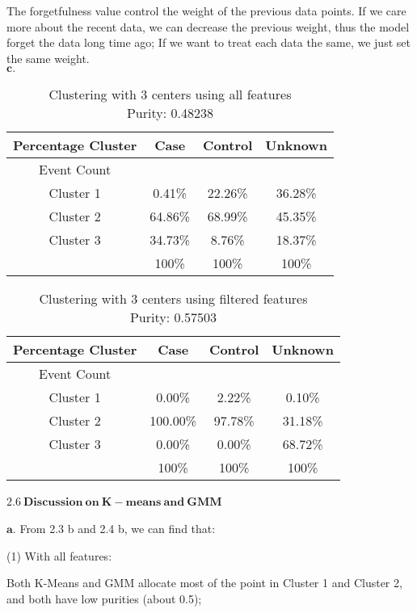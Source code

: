 \documentclass[12pt]{article}
\begin{document}
The forgetfulness value control the weight of the previous data points. If we care more about the recent data, we can decrease the previous weight, thus the model forget the data long time ago; If we want to treat each data the same, we just set the same weight.\\


$\mathbf{c.}$

\begin{table}[th]
\centering
\begin{tabular}{@{}c|c|c|c}
\hline
Percentage Cluster & Case & Control & Unknown  \\ \hline
Event Count & & &  \\ 
Cluster 1 & 0.41\% & 22.26\%  & 36.28\%\\
Cluster 2  & 64.86\%  & 68.99\% & 45.35\%\\
Cluster 3  & 34.73\%  & 8.76\%  & 18.37\% \\ \hline
  & 100\%  & 100\%  & 100\% \\ \hline
\end{tabular}
\caption{Clustering with 3 centers using all features\\ Purity: 0.48238}
\end{table} 

\begin{table}[th]
\centering
\begin{tabular}{@{}c|c|c|c}
\hline
Percentage Cluster & Case & Control & Unknown  \\ \hline
Event Count & & &  \\ 
Cluster 1 & 0.00\% & 2.22\%  & 0.10\%\\
Cluster 2  & 100.00\%  & 97.78\% & 31.18\%\\
Cluster 3  & 0.00\%  & 0.00\%  & 68.72\% \\ \hline
  & 100\%  & 100\%  & 100\% \\ \hline
\end{tabular}
\caption{Clustering with 3 centers using filtered features\\ Purity: 0.57503}
\end{table} 


\newpage
$\mathbf{2.6 \  Discussion \ on \ K-means \ and \ GMM}$ 
$\mathbf{}$

$\mathbf{a.}$
From 2.3 b and 2.4 b, we can find that:

(1) With all features:

Both K-Means and GMM allocate most of the point in Cluster 1 and Cluster 2, and both have low purities (about 0.5);
\end{document}
